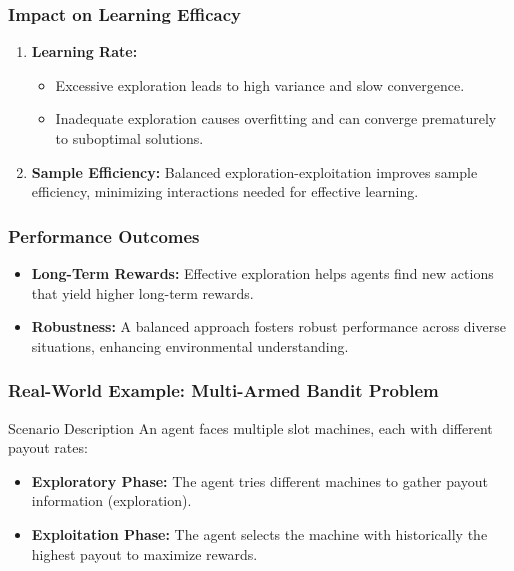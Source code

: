 \documentclass[aspectratio=169]{beamer}
\begin{document}
\begin{frame}[fragile]
    \frametitle{Impact on Learning Efficacy}
    \begin{enumerate}
        \item \textbf{Learning Rate:}
        \begin{itemize}
            \item Excessive exploration leads to high variance and slow convergence.
            \item Inadequate exploration causes overfitting and can converge prematurely to suboptimal solutions.
        \end{itemize}
        
        \item \textbf{Sample Efficiency:} 
        Balanced exploration-exploitation improves sample efficiency, minimizing interactions needed for effective learning.
    \end{enumerate}
\end{frame}

\begin{frame}[fragile]
    \frametitle{Performance Outcomes}
    \begin{itemize}
        \item \textbf{Long-Term Rewards:} 
        Effective exploration helps agents find new actions that yield higher long-term rewards.
        
        \item \textbf{Robustness:} 
        A balanced approach fosters robust performance across diverse situations, enhancing environmental understanding.
    \end{itemize}
\end{frame}

\begin{frame}[fragile]
    \frametitle{Real-World Example: Multi-Armed Bandit Problem}
    \begin{block}{Scenario Description}
        An agent faces multiple slot machines, each with different payout rates:
    \end{block}
    \begin{itemize}
        \item \textbf{Exploratory Phase:} The agent tries different machines to gather payout information (exploration).
        
        \item \textbf{Exploitation Phase:} The agent selects the machine with historically the highest payout to maximize rewards.
    \end{itemize}
\end{frame}
\end{document}
